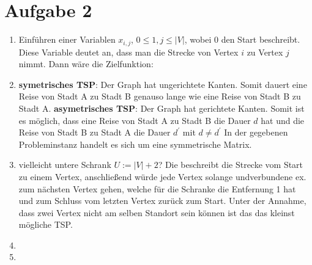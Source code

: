 \documentclass[12pt]{article}
\begin{document}
	\section{Aufgabe 2}
	\begin{enumerate}[label=(\alph*)]
		\item Einführen einer Variablen $x_{i,j}$, $0\le 1,j \le |V|$, wobei 0 den Start beschreibt. Diese Variable deutet an, dass man die Strecke von Vertex $i$ zu Vertex $j$ nimmt. Dann wäre die Zielfunktion: 
				 $ $
			
		\item \textbf{symetrisches TSP}: Der Graph hat ungerichtete Kanten. Somit dauert eine Reise von Stadt A zu Stadt B genauso lange wie eine Reise von Stadt B zu Stadt A.\newline
		\textbf{asymetrisches TSP}: Der Graph hat gerichtete Kanten. Somit ist es möglich, dass eine Reise von Stadt A zu Stadt B die Dauer $d$ hat und die Reise von Stadt B zu Stadt A die Dauer $d^\prime$ mit $d \neq d^\prime$\newline
		In der gegebenen Probleminstanz handelt es sich um eine symmetrische Matrix.
		\item vielleicht untere Schrank $U:= |V|+2$? Die beschreibt die Strecke vom Start zu einem Vertex, anschließend würde jede Vertex solange undverbundene ex. zum nächsten Vertex gehen, welche für die Schranke die Entfernung 1 hat und zum Schluss vom letzten Vertex zurück zum Start. Unter der Annahme, dass zwei Vertex nicht am selben Standort sein können ist das das kleinst mögliche TSP.
		\item
		\item
	\end{enumerate}
\end{document}
